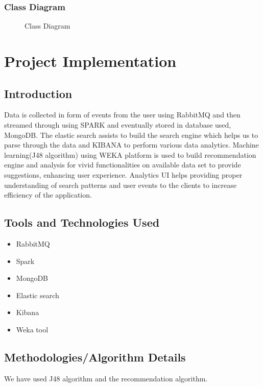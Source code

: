\documentclass[oneside,a4paper,12pt]{book}
\begin{document}
\begin{enumerate}
\begin{itemize}
\subsection{Class Diagram}
 \begin{center}
	\begin{figure}[!htbp]
		\centering
	  \caption{Class Diagram}
	  \label{fig:class-dig}
	\end{figure}
\end{center} 
 
\chapter{Project Implementation}
  \section{Introduction}
  Data is collected in form of events from the user using RabbitMQ and then streamed through using SPARK and eventually stored in database used, MongoDB. The elastic search assists to build the search engine which helps us to parse through the data and KIBANA to perform various data analytics. Machine learning(J48 algorithm) using WEKA platform is used to build recommendation engine and analysis for vivid functionalities on available data set to provide suggestions, enhancing user experience. Analytics UI helps providing proper understanding of search patterns and user events to the clients to increase efficiency of the application.
  \section{Tools and Technologies Used}
 \begin{itemize}
	\item	RabbitMQ
	\item	Spark
    \item	MongoDB
    \item   Elastic search
    \item   Kibana
    \item   Weka tool
\end{itemize} 
  \section{Methodologies/Algorithm Details}
  We have used J48 algorithm and the recommendation algorithm.

\end{itemize}
\end{enumerate}
\end{document}
